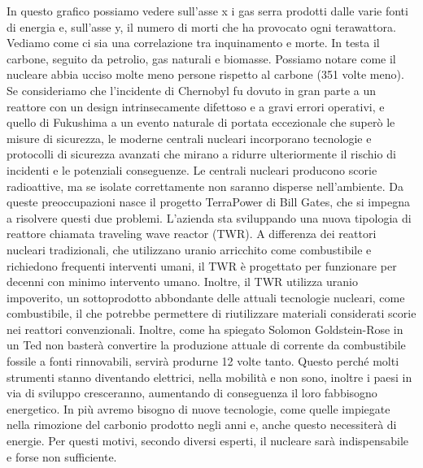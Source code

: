 \documentclass[12pt]{book} %
\begin{document}
In questo grafico possiamo vedere sull'asse x i gas serra prodotti dalle varie fonti di energia e,
sull'asse y, il numero di morti che ha provocato ogni terawattora. Vediamo come ci sia una
correlazione tra inquinamento e morte. In testa il carbone, seguito da petrolio, gas naturali e biomasse. Possiamo
notare come il nucleare abbia ucciso molte meno persone rispetto al carbone (351 volte meno). Se consideriamo che l'incidente di Chernobyl fu dovuto in gran parte a un reattore con un design intrinsecamente difettoso e a gravi errori operativi, e quello di Fukushima a un evento naturale di portata eccezionale che superò le misure di sicurezza, le moderne centrali nucleari incorporano tecnologie e protocolli di sicurezza avanzati che mirano a ridurre ulteriormente il rischio di incidenti e le potenziali conseguenze. Le centrali nucleari producono scorie radioattive,
ma se isolate correttamente non saranno disperse nell'ambiente. Da queste preoccupazioni nasce il progetto
TerraPower di Bill Gates, che si impegna a risolvere questi due
problemi. L'azienda sta sviluppando una nuova tipologia di reattore chiamata traveling wave reactor (TWR). A differenza dei reattori nucleari tradizionali, che utilizzano uranio arricchito come combustibile e richiedono frequenti interventi umani, il TWR è progettato per funzionare per decenni con minimo intervento umano.
Inoltre, il TWR utilizza uranio impoverito, un sottoprodotto abbondante delle attuali tecnologie nucleari, come combustibile, il che potrebbe permettere di riutilizzare materiali considerati scorie nei reattori convenzionali. Inoltre, come ha spiegato Solomon Goldstein-Rose in un
Ted non basterà convertire la produzione attuale di corrente da combustibile fossile a fonti rinnovabili, servirà
produrne 12 volte tanto. Questo perché molti strumenti stanno diventando elettrici, nella mobilità e non sono, inoltre
i paesi in via di sviluppo cresceranno, aumentando di conseguenza il loro fabbisogno energetico. In più avremo bisogno
di nuove tecnologie, come quelle impiegate nella rimozione del carbonio prodotto negli anni e, anche questo necessiterà
di energie. Per questi motivi, secondo diversi esperti, il nucleare sarà indispensabile e forse non sufficiente.
\end{document}
